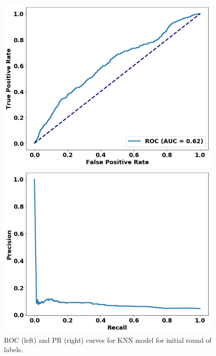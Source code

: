 \begin{figure}
\centering
\begin{minipage}[b]{.4\textwidth}
\includegraphics[trim=0in 0.1in 0.1in 0.in,clip,width=1.0\textwidth]{figures/roc_init.png}
\end{minipage}\qquad
\hspace{2ex}
\begin{minipage}[b]{.4\textwidth}
\includegraphics[trim=0in 0.1in 0.1in 0.in,clip,width=1.0\textwidth]{figures/prc_init.png}
\end{minipage}
\caption{ROC (left) and PR (right) curves for KNN model for initial round of labels.\label{fig:knn_init}}
\end{figure}

